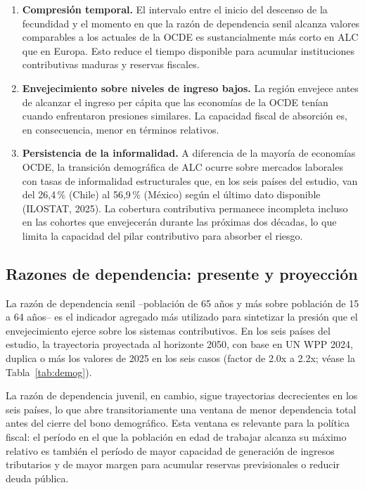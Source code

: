 \documentclass[12pt, letterpaper]{article}
\begin{document}
\begin{enumerate}
  \item \textbf{Compresión temporal.} El intervalo entre el inicio del descenso de la
        fecundidad y el momento en que la razón de dependencia senil alcanza
        valores comparables a los actuales de la OCDE es sustancialmente más corto
        en ALC que en Europa. Esto reduce el tiempo disponible para acumular
        instituciones contributivas maduras y reservas fiscales.
  \item \textbf{Envejecimiento sobre niveles de ingreso bajos.} La región envejece
        antes de alcanzar el ingreso per cápita que las economías de la OCDE tenían
        cuando enfrentaron presiones similares. La capacidad fiscal de absorción es,
        en consecuencia, menor en términos relativos.
  \item \textbf{Persistencia de la informalidad.} A diferencia de la mayoría de
        economías OCDE, la transición demográfica de ALC ocurre sobre mercados
        laborales con tasas de informalidad estructurales que, en los seis países
        del estudio, van del 26{,}4\,\% (Chile) al 56{,}9\,\% (México) según el
        último dato disponible (ILOSTAT, 2025). La cobertura contributiva permanece
        incompleta incluso en las cohortes que envejecerán durante las próximas dos
        décadas, lo que limita la capacidad del pilar contributivo para absorber el
        riesgo.
\end{enumerate}

\subsection{Razones de dependencia: presente y proyección}
\label{sec:rd}

La razón de dependencia senil --población de 65 años y más sobre población de 15 a
64 años-- es el indicador agregado más utilizado para sintetizar la presión que el
envejecimiento ejerce sobre los sistemas contributivos. En los seis países del
estudio, la trayectoria proyectada al horizonte 2050, con base en UN WPP 2024,
duplica o más los valores de 2025 en los seis casos (factor de 2.0x a 2.2x; véase la
Tabla~\ref{tab:demog}).

La razón de dependencia juvenil, en cambio, sigue trayectorias decrecientes en los
seis países, lo que abre transitoriamente una ventana de menor dependencia total
antes del cierre del bono demográfico. Esta ventana es relevante para la política
fiscal: el período en el que la población en edad de trabajar alcanza su máximo
relativo es también el período de mayor capacidad de generación de ingresos
tributarios y de mayor margen para acumular reservas previsionales o reducir deuda
pública.
\end{document}
